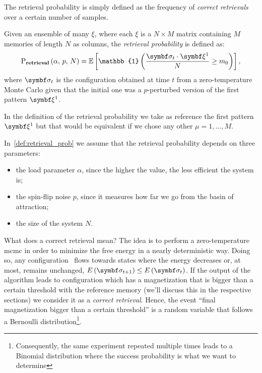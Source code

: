 \documentclass[\rootdir/main.tex]{subfiles}
\begin{document}
The retrieval probability  is simply defined as the frequency of \emph{correct retrievals} over a certain number of samples.
\begin{definition}
\label{def:retrieval_prob}
    Given an ensemble of many $\xi$, where each $\xi$ is a $N \times M$ matrix containing $M$ memories of length $N$ as columns, the \emph{retrieval probability} is defined as:
    \begin{equation}\label{eq:pret_definition}
        \mathrm{P}_{\textbf{retrieval}} \left( \alpha, \, p, \, N \right) = \mathbb{E} \left[ \mathbb{1} \left( \frac{\bsigma_t \cdot \bxi[1]}{N} \geq m_0 \right) \right],
    \end{equation}
where $\bsigma_t$ is the configuration obtained at time $t$ from a zero-temperature Monte Carlo given that the initial one was a $p$-perturbed version of the first pattern $\bxi[1]$.
\end{definition}
\begin{remark}
    In the definition of the retrieval probability we take as reference the first pattern $\bxi[1]$ but that would be equivalent if we chose any other $\mu = 1, \dots, M$.
\end{remark}
In~\cref{def:retrieval_prob} we assume that the retrieval probability depends on three parameters:
\begin{itemize}
    \item the load parameter $\alpha$, since the higher the value, the less efficient the system is;
    \item the spin-flip noise $p$, since it measures how far we go from the basin of attraction;
    \item the size of the system $N$.
\end{itemize}
What does a correct retrieval mean? The idea is to perform a zero-temperature \acrlong{mcmc} in order to minimize the free energy in a nearly deterministic way. Doing so, any configuration \bsigma\ flows towards states where the energy decreases or, at most, remains unchanged, \ie $E\left( \bsigma_{t + 1}\right) \leq E \left( \bsigma_t \right)$. If the output of the algorithm leads to configuration which has a magnetization that is bigger than a certain threshold with the reference memory (we'll discuss this in the respective sections) we consider it as a \emph{correct retrieval}. Hence, the event ``final magnetization bigger than a certain threshold'' is a random variable that follows a Bernoulli distribution\footnote{Consequently, the same experiment repeated multiple times leads to a Binomial distribution where the success probability is what we want to determine}.\\
\end{document}
